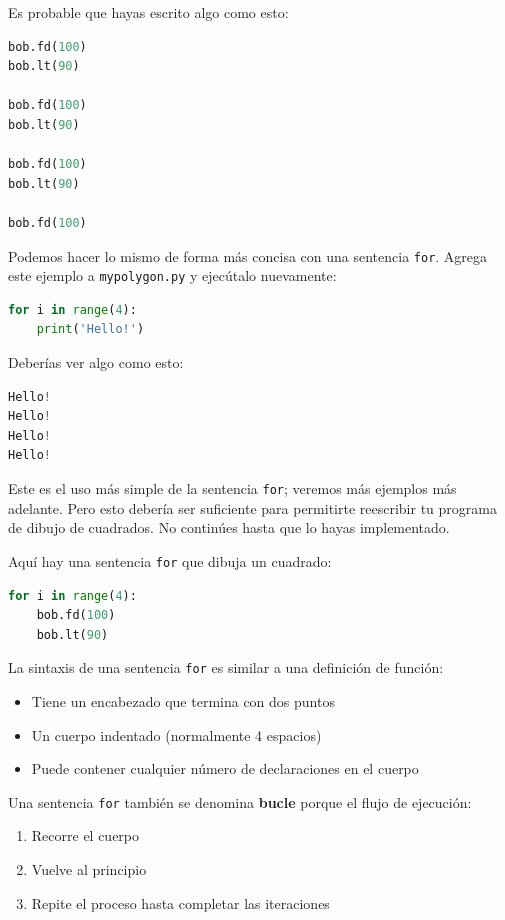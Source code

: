 Es probable que hayas escrito algo como esto:

\begin{lstlisting}[language=Python]
bob.fd(100)
bob.lt(90)

bob.fd(100)
bob.lt(90)

bob.fd(100)
bob.lt(90)

bob.fd(100)
\end{lstlisting}

Podemos hacer lo mismo de forma más concisa con una sentencia \texttt{for}. Agrega este ejemplo a \texttt{mypolygon.py} y ejecútalo nuevamente:

\begin{lstlisting}[language=Python]
for i in range(4):
    print('Hello!')
\end{lstlisting}

Deberías ver algo como esto:

\begin{lstlisting}[language=Python]
Hello!
Hello!
Hello!
Hello!
\end{lstlisting}

Este es el uso más simple de la sentencia \texttt{for}; veremos más ejemplos más adelante. Pero esto debería ser suficiente para permitirte reescribir tu programa de dibujo de cuadrados. No continúes hasta que lo hayas implementado.

Aquí hay una sentencia \texttt{for} que dibuja un cuadrado:

\begin{lstlisting}[language=Python]
for i in range(4):
    bob.fd(100)
    bob.lt(90)
\end{lstlisting}

La sintaxis de una sentencia \texttt{for} es similar a una definición de función:
\begin{itemize}
\item Tiene un encabezado que termina con dos puntos
\item Un cuerpo indentado (normalmente 4 espacios)
\item Puede contener cualquier número de declaraciones en el cuerpo
\end{itemize}

Una sentencia \texttt{for} también se denomina \textbf{bucle} porque el flujo de ejecución:
\begin{enumerate}
\item Recorre el cuerpo
\item Vuelve al principio
\item Repite el proceso hasta completar las iteraciones
\end{enumerate}

